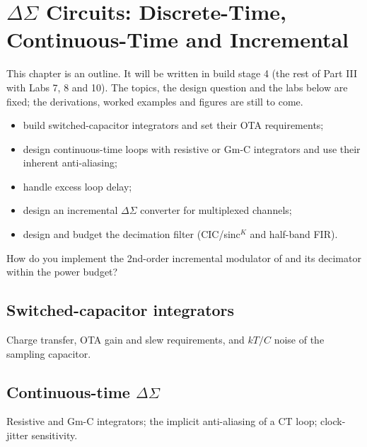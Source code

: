 \chapter{$\Delta\Sigma$ Circuits: Discrete-Time, Continuous-Time and Incremental}\label{ch:dscircuits}

\begin{specnote}
This chapter is an outline. It will be written in build stage 4 (the rest of Part III with Labs 7, 8 and 10). The topics, the design question and the labs below are fixed; the derivations, worked examples and figures are still to come.
\end{specnote}

\begin{objectives}
\begin{itemize}
  \item build switched-capacitor integrators and set their OTA requirements;
  \item design continuous-time loops with resistive or Gm-C integrators and use their inherent anti-aliasing;
  \item handle excess loop delay;
  \item design an incremental $\Delta\Sigma$ converter for multiplexed channels;
  \item design and budget the decimation filter (CIC/sinc$^K$ and half-band FIR).
\end{itemize}
\end{objectives}

\begin{insight}
How do you implement the 2nd-order incremental modulator of \OB{} and its decimator within the power budget?
\end{insight}

\section{Switched-capacitor integrators}\label{sec:ch20-1}
Charge transfer, OTA gain and slew requirements, and $kT/C$ noise of the sampling capacitor.

\section{Continuous-time \texorpdfstring{$\Delta\Sigma$}{Delta-Sigma}}\label{sec:ch20-2}
Resistive and Gm-C integrators; the implicit anti-aliasing of a CT loop; clock-jitter sensitivity.

